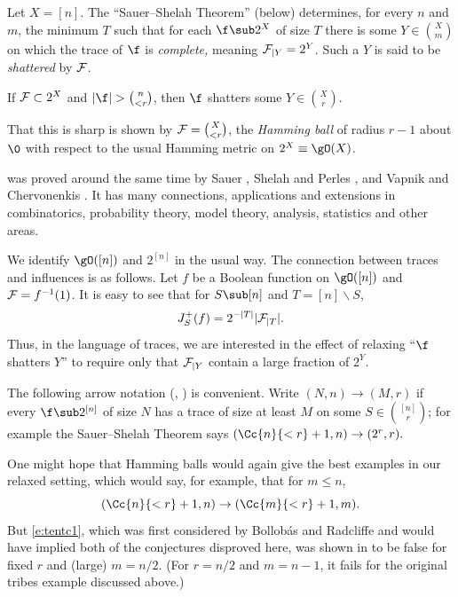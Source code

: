 Let $X = [n]$.
%
The ``Sauer--Shelah Theorem'' (below)
determines, for every $n$ and $m$, the minimum $T$
such that for each $\f\sub 2^X$ of size $T$ there is some
$Y \in \binom{X}{m}$ on which the trace of $\f$ is \emph{complete,}
meaning ${\cal F}_{|Y}=2^Y$. Such a $Y$
is said to be \emph{shattered} by ${\cal F}$.

\begin {thm}
\label {t:sas}
If ${\cal F} \subset 2^{X}$ and
$|\f| > \binom{n}{< r} $,
%
then $\f$ shatters some $Y\in \binom{X}{r}$.
\end {thm}

\nin
That this is sharp is shown by
${\cal F} = \binom{X}{< r}$, the \emph{Hamming ball}
of radius $r-1$ about
$\0$ with respect to the usual Hamming metric on
$2^{X}\equiv \gO(X)$.

 was proved
around the same time by Sauer \cite {Sa},
Shelah and Perles \cite{Sh}, and Vapnik and Chervonenkis \cite {VC}.
%
It has many connections, applications and extensions
in combinatorics, probability theory, model theory, analysis, statistics
and other areas.
%

We identify $\gO([n])$ and $2^{[n]}$ in the usual way.
The connection between traces and influences is as follows.
Let $f$ be a Boolean function on $\gO([n])$
and
${\cal F} =f^{-1}(1)$.
It is easy to see
that for
$S\sub [n]$ and $T = [n] \backslash S$,
$$J^+_S(f)=2^{-|T|}|{\cal F}_{|T}| .$$
Thus, in the language of traces, we are interested in
the effect of relaxing ``$\f$ shatters $Y$''
to require only that
${\cal F}_{|Y}$ contain a large fraction of $2^Y$.

The following arrow notation
(\eg, \cite {Bo,Fr,AMS19}) is convenient.  Write
$(N,n) \to (M,r)$ if every $\f\sub 2^{[n]}$
of size %
$N$   %
has a trace of size at least $M$ on some
$S \in \binom{[n]}{r}$; for example the Sauer--Shelah Theorem
says $(\Cc{n}{< r}+1,n) \to (2^r,r).$


\medskip
One might hope that Hamming balls would again give the
best examples in our relaxed setting, which would say, for example,
that for $m \le n$,
\begin {equation}
\label{e:tentc1}
(\Cc{n}{< r}+1,n) \to (\Cc{m}{< r}+1,m).
\end {equation}
But \eqref{e:tentc1}, which was first considered by
Bollob\'as and Radcliffe \cite{BR}
and would have implied both of the conjectures
disproved here,
was shown in \cite{BR} to be false
for fixed $r$ and (large) $m=n/2$.
(For $r=n/2$
and $m=n-1$, it fails for the original tribes example
discussed above.)



